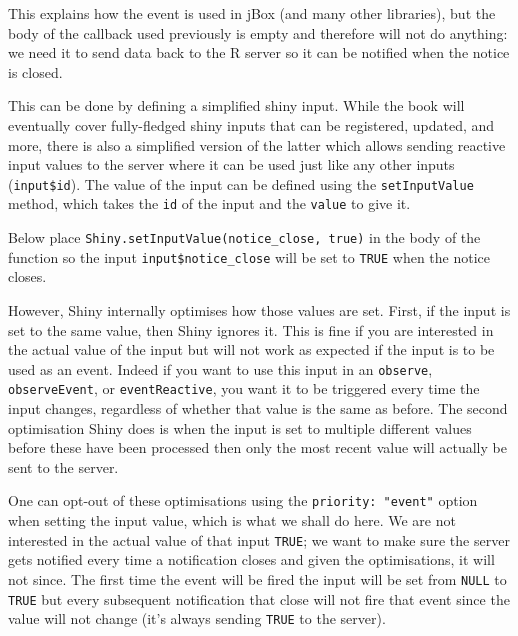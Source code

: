 \documentclass[10pt,]{krantz}
\makeatletter
\newenvironment{Shaded}{\begin{snugshade}}{\end{snugshade}}
\newcommand{\KeywordTok}[1]{\textcolor[rgb]{0.27,0.27,0.27}{\textbf{#1}}}
\newcommand{\NormalTok}[1]{#1}
\newcommand{\OperatorTok}[1]{\textcolor[rgb]{0.43,0.43,0.43}{\textbf{#1}}}
\newcommand{\StringTok}[1]{\textcolor[rgb]{0.5,0.5,0.5}{#1}}
\newenvironment{kframe}{%
\medskip{}
\setlength{\fboxsep}{.8em}
 \def\at@end@of@kframe{}%
 \ifinner\ifhmode%
  \def\at@end@of@kframe{\end{minipage}}%
  \begin{minipage}{\columnwidth}%
 \fi\fi%
 \def\FrameCommand##1{\hskip\@totalleftmargin \hskip-\fboxsep
 \colorbox{shadecolor}{##1}\hskip-\fboxsep
     \hskip-\linewidth \hskip-\@totalleftmargin \hskip\columnwidth}%
 \MakeFramed {\advance\hsize-\width
   \@totalleftmargin\z@ \linewidth\hsize
   \@setminipage}}%
 {\par\unskip\endMakeFramed%
 \at@end@of@kframe}
\renewenvironment{Shaded}{\begin{kframe}}{\end{kframe}}
\makeatother
\begin{document}
This explains how the event is used in jBox (and many other libraries), but the body of the callback used previously is empty and therefore will not do anything: we need it to send data back to the R server so it can be notified when the notice is closed.

This can be done by defining a simplified shiny input. While the book will eventually cover fully-fledged shiny inputs that can be registered, updated, and more, there is also a simplified version of the latter which allows sending reactive input values to the server where it can be used just like any other inputs (\texttt{input\$id}). The value of the input can be defined using the \texttt{setInputValue} method, which takes the \texttt{id} of the input and the \texttt{value} to give it.

Below place \texttt{Shiny.setInputValue(\textquotesingle{}notice\_close\textquotesingle{},\ true)} in the body of the function so the input \texttt{input\$notice\_close} will be set to \texttt{TRUE} when the notice closes.

\begin{Shaded}
\end{Shaded}

However, Shiny internally optimises how those values are set. First, if the input is set to the same value, then Shiny ignores it. This is fine if you are interested in the actual value of the input but will not work as expected if the input is to be used as an event. Indeed if you want to use this input in an \texttt{observe}, \texttt{observeEvent}, or \texttt{eventReactive}, you want it to be triggered every time the input changes, regardless of whether that value is the same as before. The second optimisation Shiny does is when the input is set to multiple different values before these have been processed then only the most recent value will actually be sent to the server.

One can opt-out of these optimisations using the \texttt{priority:\ "event"} option when setting the input value, which is what we shall do here. We are not interested in the actual value of that input \texttt{TRUE}; we want to make sure the server gets notified every time a notification closes and given the optimisations, it will not since. The first time the event will be fired the input will be set from \texttt{NULL} to \texttt{TRUE} but every subsequent notification that close will not fire that event since the value will not change (it's always sending \texttt{TRUE} to the server).
\end{document}
